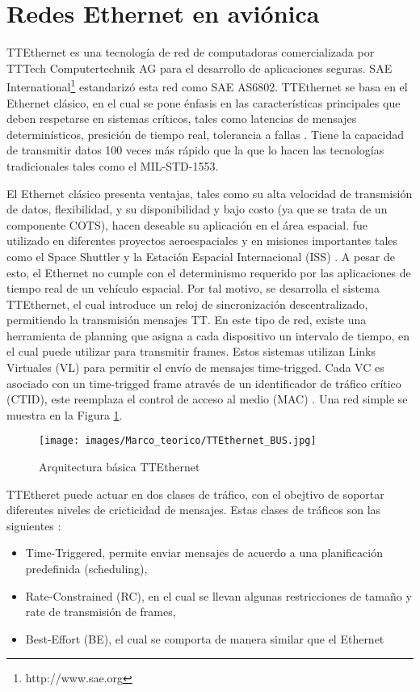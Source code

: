 \section{Redes Ethernet en aviónica}
TTEthernet es una tecnología de red de computadoras comercializada por TTTech Computertechnik AG para el desarrollo de aplicaciones seguras. SAE International\footnote{http://www.sae.org} estandarizó esta red como SAE AS6802. TTEthernet se basa en el Ethernet clásico, en el cual se pone énfasis en las características principales que deben respetarse en sistemas críticos, tales como latencias de mensajes determinísticos, presición de tiempo real, tolerancia a fallas \citep{Loveless15}. Tiene la capacidad de transmitir datos 100 veces más rápido que la que lo hacen las tecnologías tradicionales tales como el MIL-STD-1553.

El Ethernet clásico presenta ventajas, tales como su alta velocidad de transmisión de datos, flexibilidad, y su disponibilidad y bajo costo (ya que se trata de un componente COTS)\citep{Loveless15}, hacen deseable su aplicación en el área espacial.  fue utilizado en diferentes proyectos aeroespaciales y en misiones importantes tales como el Space Shuttler y la Estación Espacial Internacional (ISS) \citep{Loveless15}. A pesar de esto, el Ethernet no cumple con el determinismo requerido por las aplicaciones de tiempo real de un vehículo espacial. Por tal motivo, se desarrolla el sistema TTEthernet, el cual introduce un reloj de sincronización descentralizado, permitiendo la transmisión mensajes \ac{TT}. En este tipo de red, existe una herramienta de planning que asigna a cada dispositivo un intervalo de tiempo, en el cual puede utilizar para transmitir frames. Estos sistemas utilizan Links Virtuales (VL) para permitir el envío de mensajes time-trigged. Cada VC es asociado con un time-trigged frame através de un identificador de tráfico crítico (CTID), este reemplaza el control de acceso al medio (MAC) \citep{Loveless15}. Una red simple se muestra en la Figura \ref{fig:Arq_TTEthernet}.

\begin{figure}[h]
 \centering
 \texttt{[image: images/Marco\_teorico/TTEthernet\_BUS.jpg]}
  \caption{Arquitectura básica TTEthernet}
\label{fig:Arq_TTEthernet}
\end{figure}

TTEtheret puede actuar en dos clases de tráfico, con el obejtivo de soportar diferentes niveles de cricticidad de mensajes. Estas clases de tráficos son las siguientes \citep{Loveless15} \citep{Steiner13}:
\begin{itemize}
	\item Time-Triggered, permite enviar mensajes de acuerdo a una planificación predefinida (scheduling),
	\item Rate-Constrained (RC), en el cual se llevan algunas restricciones de tamaño y rate de transmisión de frames,
	\item Best-Effort (BE), el cual se comporta de manera similar que el Ethernet
\end{itemize}

